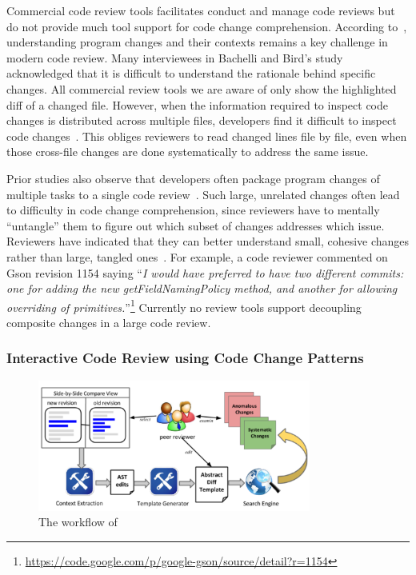 \documentclass[runningheads,a4paper]{llncs}
\begin{document}
Commercial code review tools facilitates conduct and manage code reviews but do not provide much tool support for code change comprehension. According to~\cite{bacchelli2013expectations}, understanding program changes and their contexts remains a key challenge in modern code review. Many interviewees in Bachelli and Bird's study acknowledged that it is difficult to understand the rationale behind specific changes. All commercial review tools we are aware of only show the highlighted diff of a changed file. However, when the information required to inspect code changes is distributed across multiple files, developers find it difficult to inspect code changes~\cite{dunsmore2000object}. This obliges reviewers to read changed lines file by file, even when those cross-file changes are done systematically to address the same issue. 

Prior studies also observe that developers often package program changes of multiple tasks to a single code review~\cite{kawrykow2011non,Murphy-Hill2012:refactor,herzig2013impact}. Such large, unrelated changes often lead to difficulty in code change comprehension, since reviewers have to mentally ``untangle'' them to figure out which subset of changes addresses which issue. Reviewers have indicated that they can better understand small, cohesive changes rather than large, tangled ones~\cite{rigby2008open}. For example, a code reviewer commented on Gson revision 1154 saying ``{\em I would have preferred to have two different commits: one for adding the new {\ttt getFieldNamingPolicy} method, and another for allowing overriding of primitives.}''\footnote{\url{https://code.google.com/p/google-gson/source/detail?r=1154}} Currently no review tools support decoupling composite changes in a large code review. 

\subsubsection{Interactive Code Review using Code Change Patterns}

\begin{figure}[ht]
 \centering
 \includegraphics[width=0.8\textwidth]{images/critics-workflow.pdf}
 \caption{The workflow of {\critics}}
 \label{fig:critics-workflow}
\end{figure}
\end{document}
